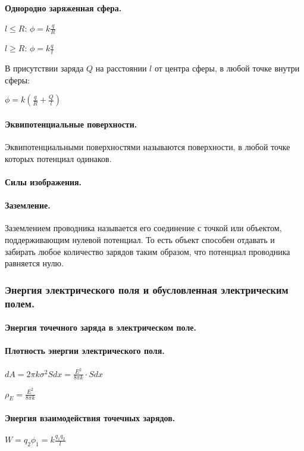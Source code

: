 \documentclass{article}
\begin{document}
                \textbf{Однородно заряженная сфера.}
                
                \(l \leq R\): \(\phi = k\frac{q}{R}\)

                \(l \geq R\): \(\phi = k\frac{q}{l}\)

                В присутствии заряда \(Q\) на расстоянии \(l\) от центра сферы, в любой точке внутри сферы:

                \(\phi = k(\frac{q}{R} + \frac{Q}{l})\)
            \paragraph{Эквипотенциальные поверхности.}
                Эквипотенциальными поверхностями называются поверхности, в любой точке которых потенциал одинаков.
            \paragraph{Силы изображения.}
            \paragraph{Заземление.}
                Заземлением проводника называется его соединение с точкой или объектом, поддерживающим нулевой потенциал. То есть объект способен отдавать и забирать любое количество зарядов таким образом, что потенциал проводника равняется нулю.
        \subsubsection{Энергия электрического поля и обусловленная электрическим полем.}
            \paragraph{Энергия точечного заряда в электрическом поле.}
            \paragraph{Плотность энергии электрического поля.}
                \(dA = 2\pi k \sigma^2 S dx = \frac{E^2}{8\pi k} \cdot S dx\)

                \(\rho_E = \frac{E^2}{8\pi k}\)
            \paragraph{Энергия взаимодействия точечных зарядов.}
                \(W = q_2\phi_1 = k\frac{q_1q_2}{l}\)
\end{document}
